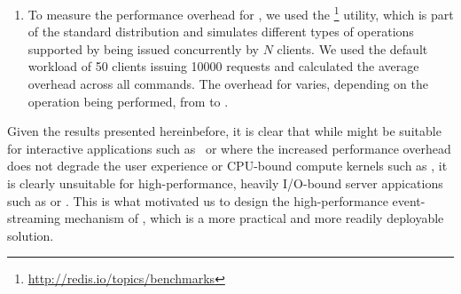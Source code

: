 \begin{enumerate}
\item[\redis] To measure the performance overhead for \redis, we used the
  \redisbenchmark\footnote{\url{http://redis.io/topics/benchmarks}} utility,
  which is part of the standard \redis distribution and simulates different
  types of operations supported by \redis being issued concurrently by $N$
  clients. We used the default workload of \num{50} clients issuing \num{10000}
  requests and calculated the average overhead across all commands. The
  overhead for \redis varies, depending on the operation being performed, from
  \minRedisOver to \maxRedisOver.
\end{enumerate}

Given the results presented hereinbefore, it is clear that while \mx might be
suitable for interactive applications such as \gnu~\coreutils or \vim where the
increased performance overhead does not degrade the user experience or
CPU-bound compute kernels such as \speczerosix, it is clearly
unsuitable for high-performance, heavily I/O-bound server
appications such as \lighttpd or \redis. This is what motivated
us to design the high-performance event-streaming mechanism of
\varan, which is a more practical and more readily deployable solution.
